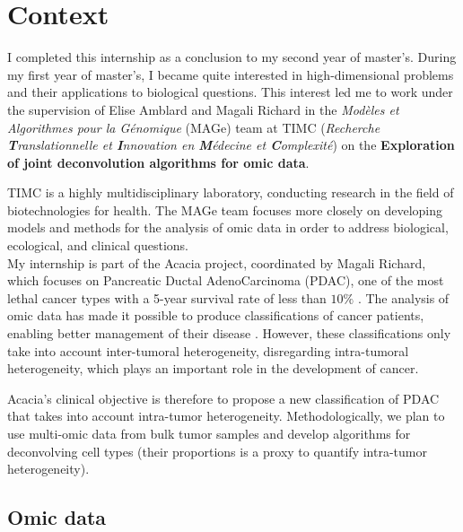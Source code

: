 \documentclass{article}
\begin{document}
\newpage

\tableofcontents

\newpage

\section{Context}\label{sec:context}

I completed this internship as a conclusion to my second year of master's.
During my first year of master's, I became quite interested in high-dimensional problems and their applications to biological questions.
This interest led me to work under the supervision of Elise Amblard and Magali Richard in the \textit{Modèles et Algorithmes pour la Génomique} (MAGe) team at TIMC (\textit{Recherche \textbf{T}ranslationnelle et \textbf{I}nnovation en \textbf{M}édecine et \textbf{C}omplexité}) on the \textbf{Exploration of joint deconvolution algorithms for omic data}.

TIMC is a highly multidisciplinary laboratory, conducting research in the field of biotechnologies for health.
The MAGe team focuses more closely on developing models and methods for the analysis of omic data in order to address biological, ecological, and clinical questions. \\

My internship is part of the Acacia project, coordinated by Magali Richard, which focuses on Pancreatic Ductal AdenoCarcinoma (PDAC), one of the most lethal cancer types with a 5-year survival rate of less than $10\%$ \cite{bengtsson_2020_rate}.
The analysis of omic data has made it possible to produce classifications of cancer patients, enabling better management of their disease \cite{moffitt_2015_stratification, puleo_2018_stratification}.
However, these classifications only take into account inter-tumoral heterogeneity, disregarding intra-tumoral heterogeneity, which plays an important role in the development of cancer.

Acacia's clinical objective is therefore to propose a new classification of PDAC that takes into account intra-tumor heterogeneity.
Methodologically, we plan to use multi-omic data from bulk tumor samples and develop algorithms for deconvolving cell types (their proportions is a proxy to quantify intra-tumor heterogeneity).

\subsection{Omic data}\label{subsec:omic-data}
\end{document}

